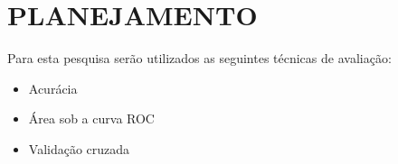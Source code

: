 \chapter{PLANEJAMENTO}

Para esta pesquisa serão utilizados as seguintes técnicas de avaliação:

\begin{itemize}
	\item Acurácia
	\item Área sob a curva ROC
	\item Validação cruzada
\end{itemize}
